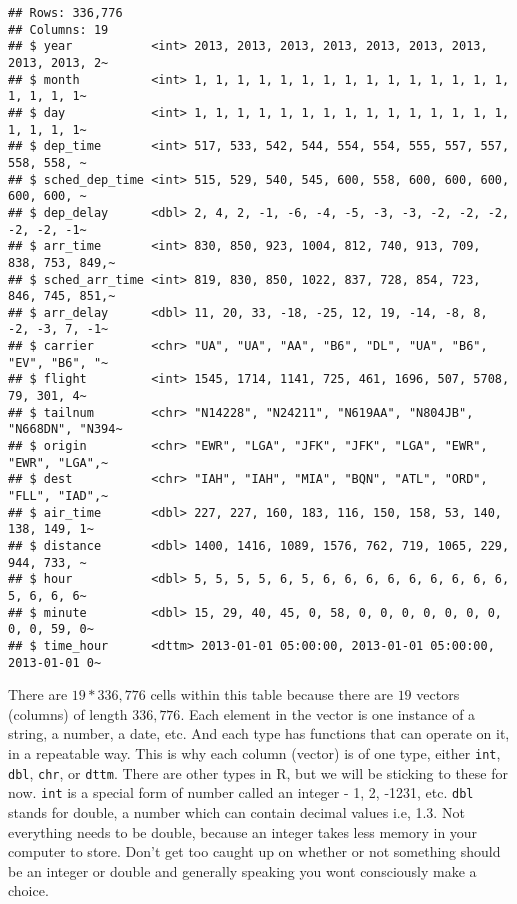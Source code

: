 \documentclass[
]{book}
\begin{document}
\begin{verbatim}
## Rows: 336,776
## Columns: 19
## $ year           <int> 2013, 2013, 2013, 2013, 2013, 2013, 2013, 2013, 2013, 2~
## $ month          <int> 1, 1, 1, 1, 1, 1, 1, 1, 1, 1, 1, 1, 1, 1, 1, 1, 1, 1, 1~
## $ day            <int> 1, 1, 1, 1, 1, 1, 1, 1, 1, 1, 1, 1, 1, 1, 1, 1, 1, 1, 1~
## $ dep_time       <int> 517, 533, 542, 544, 554, 554, 555, 557, 557, 558, 558, ~
## $ sched_dep_time <int> 515, 529, 540, 545, 600, 558, 600, 600, 600, 600, 600, ~
## $ dep_delay      <dbl> 2, 4, 2, -1, -6, -4, -5, -3, -3, -2, -2, -2, -2, -2, -1~
## $ arr_time       <int> 830, 850, 923, 1004, 812, 740, 913, 709, 838, 753, 849,~
## $ sched_arr_time <int> 819, 830, 850, 1022, 837, 728, 854, 723, 846, 745, 851,~
## $ arr_delay      <dbl> 11, 20, 33, -18, -25, 12, 19, -14, -8, 8, -2, -3, 7, -1~
## $ carrier        <chr> "UA", "UA", "AA", "B6", "DL", "UA", "B6", "EV", "B6", "~
## $ flight         <int> 1545, 1714, 1141, 725, 461, 1696, 507, 5708, 79, 301, 4~
## $ tailnum        <chr> "N14228", "N24211", "N619AA", "N804JB", "N668DN", "N394~
## $ origin         <chr> "EWR", "LGA", "JFK", "JFK", "LGA", "EWR", "EWR", "LGA",~
## $ dest           <chr> "IAH", "IAH", "MIA", "BQN", "ATL", "ORD", "FLL", "IAD",~
## $ air_time       <dbl> 227, 227, 160, 183, 116, 150, 158, 53, 140, 138, 149, 1~
## $ distance       <dbl> 1400, 1416, 1089, 1576, 762, 719, 1065, 229, 944, 733, ~
## $ hour           <dbl> 5, 5, 5, 5, 6, 5, 6, 6, 6, 6, 6, 6, 6, 6, 6, 5, 6, 6, 6~
## $ minute         <dbl> 15, 29, 40, 45, 0, 58, 0, 0, 0, 0, 0, 0, 0, 0, 0, 59, 0~
## $ time_hour      <dttm> 2013-01-01 05:00:00, 2013-01-01 05:00:00, 2013-01-01 0~
\end{verbatim}

There are \(19*336,776\) cells within this table because there are \(19\) vectors (columns) of length \(336,776\). Each element in the vector is one instance of a string, a number, a date, etc. And each type has functions that can operate on it, in a repeatable way. This is why each column (vector) is of one type, either \texttt{int}, \texttt{dbl}, \texttt{chr}, or \texttt{dttm}. There are other types in R, but we will be sticking to these for now. \texttt{int} is a special form of number called an integer - 1, 2, -1231, etc. \texttt{dbl} stands for double, a number which can contain decimal values i.e, 1.3. Not everything needs to be double, because an integer takes less memory in your computer to store. Don't get too caught up on whether or not something should be an integer or double and generally speaking you wont consciously make a choice.
\end{document}
